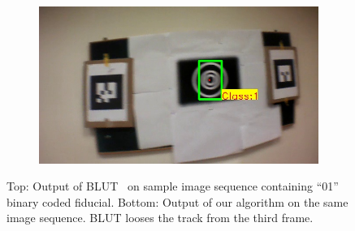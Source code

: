 \documentclass[runningheads]{llncs}
\begin{document}
\begin{figure}
\begin{subfigure}[b]{.19\textwidth}
\end{subfigure}
\begin{subfigure}[b]{.19\textwidth}
\includegraphics[width=\linewidth]{BLUT_input_01/output15.jpg}
\end{subfigure}
\caption{Top: Output of BLUT~\cite{Wu:2011} on sample image sequence containing
``01'' binary coded fiducial. Bottom: Output of our algorithm on the same image
sequence. BLUT looses the track from the third frame.}
\label{fig:BLUT_compare_01}
\end{figure}
\end{document}
